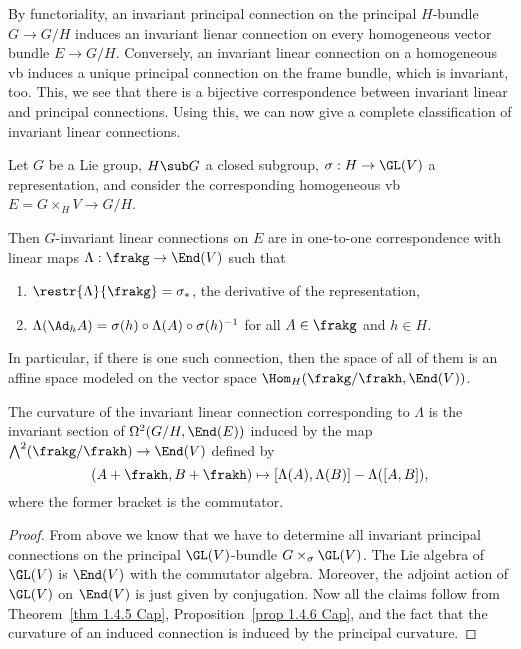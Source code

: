 By functoriality, an invariant principal connection on the principal $H$-bundle $G\to G\slash H$ induces an invariant lienar connection on every homogeneous vector bundle $E\to G\slash H$. Conversely, an invariant linear connection on a homogeneous \gls{vb} induces a unique principal connection on the frame bundle, which is invariant, too. This, we see that there is a bijective correspondence between invariant linear and principal connections. Using this, we can now give a complete classification of invariant linear connections.

\begin{thm}\label{thm 1.4.7 Cap}
    Let $G$ be a Lie group, $H\sub G$ a closed subgroup, $\sigma:H\to \GL(V)$ a representation, and consider the corresponding homogeneous \gls{vb} $E=G\times_H V\to G\slash H$.

    Then $G$-invariant linear connections on $E$ are in one-to-one correspondence with linear maps $\Lambda:\frakg\to \End(V)$ such that 
    \begin{enumerate}[label=(\roman*)]
        \item $\restr{\Lambda}{\frakg}=\sigma_\ast$, the derivative of the representation,
        \item $\Lambda(\Ad_h A)=\sigma(h)\circ\Lambda(A)\circ \sigma(h)^{-1}$ for all $A\in\frakg$ and $h\in H$.
    \end{enumerate}
    In particular, if there is one such connection, then the space of all of them is an affine space modeled on the vector space $\Hom_H(\frakg\slash\frakh,\End(V))$.

    The curvature of the invariant linear connection corresponding to $\Lambda$ is the invariant section of $\Omega^2(G\slash H,\End(E))$ induced by the map $\bigwedge^2(\frakg\slash\frakh)\to \End(V)$ defined by 
    \[(A+\frakh,B+\frakh)\mapsto [\Lambda(A),\Lambda(B)]-\Lambda([A,B]),\]
    where the former bracket is the commutator.
\end{thm}
\begin{proof}
    From above we know that we have to determine all invariant principal connections on the principal $\GL(V)$-bundle $G\times_\sigma \GL(V)$. The Lie algebra of $\GL(V)$ is $\End(V)$ with the commutator algebra. Moreover, the adjoint action of $\GL(V)$ on $\End(V)$ is just given by conjugation. Now all the claims follow from Theorem~\ref{thm 1.4.5 Cap}, Proposition~\ref{prop 1.4.6 Cap}, and the fact that the curvature of an induced connection is induced by the principal curvature.
\end{proof}

